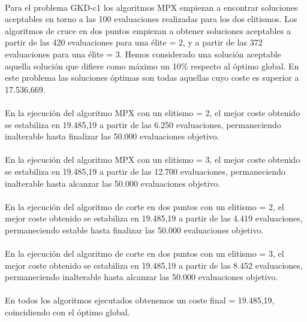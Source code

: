 	\paragraph{}Para el problema GKD-c1 los algoritmos MPX empiezan a encontrar soluciones aceptables en torno a las 100 evaluaciones realizadas para los dos elitismos. Los algoritmos de cruce en dos puntos empiezan a obtener soluciones aceptables a partir de las 420 evaluaciones para una élite = 2, y a partir de las 372 evaluaciones para una élite = 3. Hemos considerado una solución aceptable aquella solución que difiere como máximo un 10\% respecto al óptimo global. En este problema las soluciones óptimas son todas aquellas cuyo coste es superior a 17.536,669.
	
	\paragraph{}En la ejecución del algoritmo MPX con un elitismo = 2, el mejor coste obtenido se estabiliza en 19.485,19 a partir de las 6.250 evaluaciones, permaneciendo inalterable hasta finalizar las 50.000 evaluaciones objetivo.
	
	\paragraph{}En la ejecución del algoritmo MPX con un elitismo = 3, el mejor coste obtenido se estabiliza en 19.485,19 a partir de las 12.700 evaluaciones, permaneciendo inalterable hasta alcanzar las 50.000 evaluaciones objetivo.
	
	\paragraph{}En la ejecución del algoritmo de corte en dos puntos con un elitismo = 2, el mejor coste obtenido se estabiliza en 19.485,19 a partir de las 4.419 evaluaciones, permaneciendo estable hasta finalizar las 50.000 evaluaciones objetivo.
	
	\paragraph{}En la ejecución del algoritmo de corte en dos puntos con un elitismo = 3, el mejor coste obtenido se estabiliza en 19.485,19 a partir de las 8.452 evaluaciones, permaneciendo inalterable hasta alcanzar las 50.000 evaluaciones objetivo.
	
	\paragraph{}En todos los algoritmos ejecutados obtenemos un coste final = 19.485,19, coincidiendo con el óptimo global.

